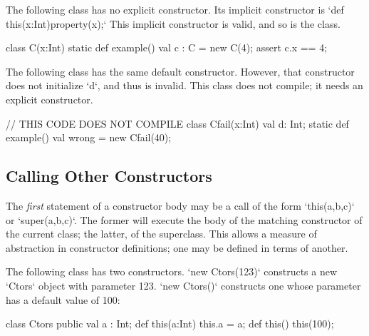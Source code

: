 \begin{ex}
The following class has no explicit constructor.
Its implicit constructor is 
\xcd`def this(x:Int){property(x);}`
This implicit constructor is valid, and so is the class. 
\begin{xten}
class C(x:Int) {
  static def example() {
    val c : C = new C(4);
    assert c.x == 4;
  }
}
\end{xten}
\noindent 


The following class has the same default constructor.  However, that
constructor does not initialize \xcd`d`, and thus is invalid.  This 
class does not compile; it needs an explicit constructor.
\begin{xten}
// THIS CODE DOES NOT COMPILE
class Cfail(x:Int) {
  val d: Int;
  static def example() {
    val wrong = new Cfail(40);
  }
}
\end{xten}
%


\end{ex}

\subsection{Calling Other Constructors}
\label{sect:call-another-ctor}

The {\em first} statement of a constructor body may be a call of the form 
\xcd`this(a,b,c)` or \xcd`super(a,b,c)`.  The former will execute the body of
the matching constructor of the current class; the latter, of the superclass. 
This allows a measure of abstraction in constructor definitions; one may be
defined in terms of another.

\begin{ex}
The following class has two constructors.  \xcd`new Ctors(123)` constructs a
new \xcd`Ctors` object with parameter 123.  \xcd`new Ctors()` constructs one
whose parameter has a default value of 100: 
\begin{xten}
class Ctors {
  public val a : Int;
  def this(a:Int) { this.a = a; }
  def this()      { this(100);  }
}
\end{xten}
\end{ex}

